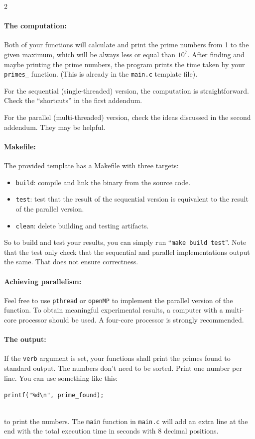 \documentclass[12pt]{article}
\begin{document}
\begin{multicols}{2}
\paragraph{The computation:} Both of your functions will calculate and print the prime numbers from 1 to the given maximum, which will be always less or equal than $10^7$.
After finding and maybe printing the prime numbers, the program prints the time taken by your \texttt{primes\_}  function. (This is already in the \texttt{main.c} template file).

For the sequential (single-threaded) version, the computation is straightforward. Check the ``shortcuts'' in the first addendum.

For the parallel (multi-threaded) version, check the ideas discussed in the second addendum. They may be helpful. 

\paragraph{Makefile:} The provided template has a Makefile with three targets:
\begin{itemize}
  \item \texttt{build}: compile and link the binary from the source code.
  \item \texttt{test}: test that the result of the sequential version is equivalent to the result of the parallel version.
  \item \texttt{clean}: delete building and testing artifacts.
\end{itemize}

So to build and test your results, you can simply run ``\texttt{make build test}''. Note that the test only check that the sequential and parallel implementations output the same. That does not ensure correctness.

\paragraph{Achieving parallelism:} Feel free to use \texttt{pthread} or \texttt{openMP} to implement the parallel version of the function. To obtain meaningful experimental results, a computer with a multi-core processor should be used. A four-core processor is strongly recommended.

\paragraph{The output:} If the \texttt{verb} argument is set, your functions shall print the primes found to standard output. The numbers don't need to be sorted. Print one number per line. You can use something like this:\\
\centerline{\texttt{printf("\%d\textbackslash n", prime\_found);}}\\
to print the numbers.
The \texttt{main} function in \texttt{main.c} will add an extra line at the end with the total execution time in seconds with 8 decimal positions.


\end{multicols}
\end{document}
